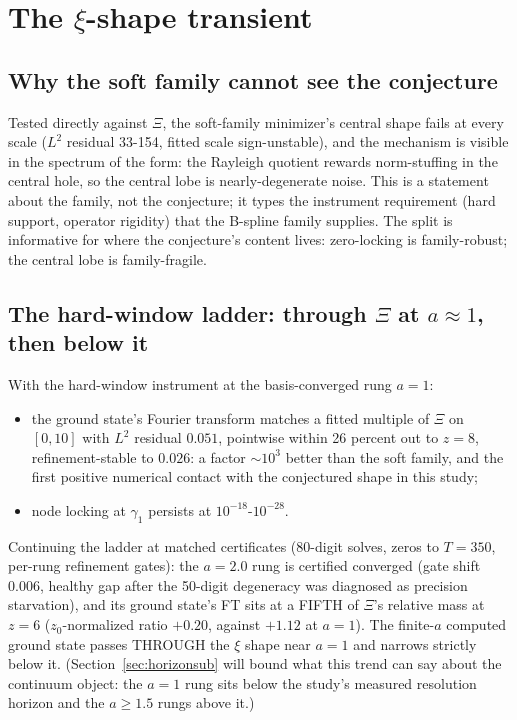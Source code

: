\documentclass[10pt]{article}
\begin{document}
\section{The $\xi$-shape transient}\label{sec:xishape}

\subsection{Why the soft family cannot see the conjecture}\label{sec:soft}

Tested directly against $\Xi$, the soft-family minimizer's central shape fails at every scale ($L^2$ residual 33-154, fitted scale sign-unstable), and the mechanism is visible in the spectrum of the form: the Rayleigh quotient rewards norm-stuffing in the central hole, so the central lobe is nearly-degenerate noise. This is a statement about the family, not the conjecture; it types the instrument requirement (hard support, operator rigidity) that the B-spline family supplies. The split is informative for where the conjecture's content lives: zero-locking is family-robust; the central lobe is family-fragile.

\subsection{The hard-window ladder: through $\Xi$ at $a \approx 1$, then below it}\label{sec:ladder}

With the hard-window instrument at the basis-converged rung $a = 1$:

\begin{itemize}
\item the ground state's Fourier transform matches a fitted multiple of $\Xi$ on $[0, 10]$ with $L^2$ residual $0.051$, pointwise within 26 percent out to $z = 8$, refinement-stable to $0.026$: a factor $\sim 10^3$ better than the soft family, and the first positive numerical contact with the conjectured shape in this study;
\item node locking at $\gamma_1$ persists at $10^{-18}$-$10^{-28}$.
\end{itemize}

Continuing the ladder at matched certificates (80-digit solves, zeros to $T = 350$, per-rung refinement gates): the $a = 2.0$ rung is certified converged (gate shift $0.006$, healthy gap after the 50-digit degeneracy was diagnosed as precision starvation), and its ground state's FT sits at a FIFTH of $\Xi$'s relative mass at $z = 6$ ($z_0$-normalized ratio $+0.20$, against $+1.12$ at $a = 1$). The finite-$a$ computed ground state passes THROUGH the $\xi$ shape near $a = 1$ and narrows strictly below it. (Section~\ref{sec:horizonsub} will bound what this trend can say about the continuum object: the $a = 1$ rung sits below the study's measured resolution horizon and the $a \ge 1.5$ rungs above it.)
\end{document}
